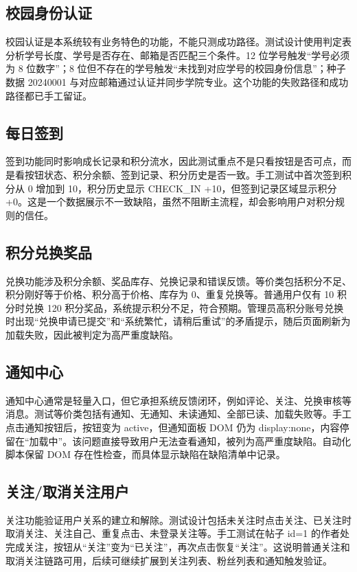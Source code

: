 \documentclass[bwprint]{report}
\begin{document}
\subsection{校园身份认证}
校园认证是本系统较有业务特色的功能，不能只测成功路径。测试设计使用判定表分析学号长度、学号是否存在、邮箱是否匹配三个条件。12 位学号触发“学号必须为 8 位数字”；8 位但不存在的学号触发“未找到对应学号的校园身份信息”；种子数据 20240001 与对应邮箱通过认证并同步学院专业。这个功能的失败路径和成功路径都已手工留证。

\subsection{每日签到}
签到功能同时影响成长记录和积分流水，因此测试重点不是只看按钮是否可点，而是看按钮状态、积分余额、签到记录、积分历史是否一致。手工测试中首次签到积分从 0 增加到 10，积分历史显示 CHECK\_IN +10，但签到记录区域显示积分 +0。这是一个数据展示不一致缺陷，虽然不阻断主流程，却会影响用户对积分规则的信任。

\subsection{积分兑换奖品}
兑换功能涉及积分余额、奖品库存、兑换记录和错误反馈。等价类包括积分不足、积分刚好等于价格、积分高于价格、库存为 0、重复兑换等。普通用户仅有 10 积分时兑换 120 积分奖品，系统提示积分不足，符合预期。管理员高积分账号兑换时出现“兑换申请已提交”和“系统繁忙，请稍后重试”的矛盾提示，随后页面刷新为加载失败，因此被判定为高严重度缺陷。

\subsection{通知中心}
通知中心通常是轻量入口，但它承担系统反馈闭环，例如评论、关注、兑换审核等消息。测试等价类包括有通知、无通知、未读通知、全部已读、加载失败等。手工点击通知按钮后，按钮变为 active，但通知面板 DOM 仍为 display:none，内容停留在“加载中”。该问题直接导致用户无法查看通知，被列为高严重度缺陷。自动化脚本保留 DOM 存在性检查，而具体显示缺陷在缺陷清单中记录。

\subsection{关注/取消关注用户}
关注功能验证用户关系的建立和解除。测试设计包括未关注时点击关注、已关注时取消关注、关注自己、重复点击、未登录关注等。手工测试在帖子 id=1 的作者处完成关注，按钮从“关注”变为“已关注”，再次点击恢复“关注”。这说明普通关注和取消关注链路可用，后续可继续扩展到关注列表、粉丝列表和通知触发验证。
\end{document}
